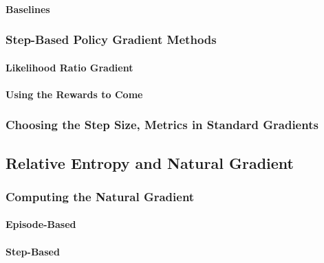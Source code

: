 				\paragraph{Baselines} %

			\subsubsection{Step-Based Policy Gradient Methods} %

				\paragraph{Likelihood Ratio Gradient} %

				\paragraph{Using the Rewards to Come} %

			\subsubsection{Choosing the Step Size, Metrics in Standard Gradients} %

		\subsection{Relative Entropy and Natural Gradient} %

			\subsubsection{Computing the Natural Gradient} %

				\paragraph{Episode-Based} %

				\paragraph{Step-Based} %

